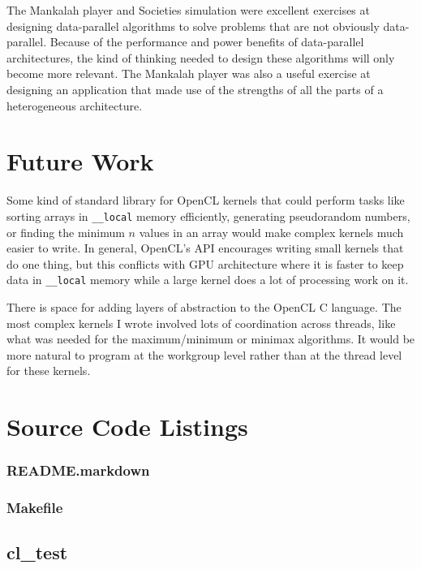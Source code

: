 \documentclass{article}
\begin{document}
The Mankalah player and Societies simulation were excellent exercises at designing data-parallel algorithms to solve problems that are not obviously data-parallel. Because of the performance and power benefits of data-parallel architectures, the kind of thinking needed to design these algorithms will only become more relevant. The Mankalah player was also a useful exercise at designing an application that made use of the strengths of all the parts of a heterogeneous architecture. 

\section{Future Work}
Some kind of standard library for OpenCL kernels that could perform tasks like sorting arrays in \texttt{\_\_local} memory efficiently, generating pseudorandom numbers, or finding the minimum $n$ values in an array would make complex kernels much easier to write. In general, OpenCL's API encourages writing small kernels that do one thing, but this conflicts with GPU architecture where it is faster to keep data in \texttt{\_\_local} memory while a large kernel does a lot of processing work on it.

There is space for adding layers of abstraction to the OpenCL C language. The most complex kernels I wrote involved lots of coordination across threads, like what was needed for the maximum/minimum or minimax algorithms. It would be more natural to program at the workgroup level rather than at the thread level for these kernels.




\appendix
\section{Source Code Listings}

\subsubsection*{README.markdown}


\subsubsection*{Makefile}


\subsection{cl\_test}
\end{document}
